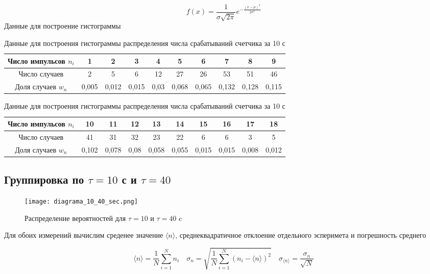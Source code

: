 \documentclass[a4paper]{article}
\begin{document}
\[
f(x) = \frac{1}{\sigma\sqrt{2\pi}} e^{-\frac{(x - \mu)^2}{2\sigma^2}}
\]
Данные для построение гистограммы 
\begin{table}[h]
\centering
\caption{Данные для построения гистограммы распределения числа срабатываний счетчика за 10 с}
\begin{tabular}{|c|c|c|c|c|c|c|c|c|c|}
\hline
Число импульсов $n_i$ & 1 & 2 & 3 & 4 & 5 & 6 & 7 & 8 & 9 \\ \hline
Число случаев & 2 & 5 & 6 & 12 & 27 & 26 & 53 & 51 & 46 \\ \hline
Доля случаев $w_n$ & 0,005 & 0,012 & 0,015 & 0,03 & 0,068 & 0,065 & 0,132 & 0,128 & 0,115 \\ \hline
\end{tabular}

\vspace{0.5cm}

\begin{tabular}{|c|c|c|c|c|c|c|c|c|c|}
\hline
Число импульсов $n_i$ & 10 & 11 & 12 & 13 & 14 & 15 & 16 & 17 & 18 \\ \hline
Число случаев & 41 & 31 & 32 & 23 & 22 & 6 & 6 & 3 & 5 \\ \hline
Доля случаев $w_n$ & 0,102 & 0,078 & 0,08 & 0,058 & 0,055 & 0,015 & 0,015 & 0,008 & 0,012 \\ \hline
\end{tabular}
\end{table}




\subsection{Группировка по \( \tau = 10 \) с и \( \tau = 40 \) }

\begin{figure}[h]
    \centering
    \texttt{[image: diagrama\_10\_40\_sec.png]}
    \caption{Распределение вероятностей для  $\tau = 10$ и $\tau = 40$ c}
    \label{fig:my_label}
\end{figure}


Для обоих измерений вычислим среденее значение $\langle n \rangle$, среднеквадратичное отклоение отдельного эсперимета и погрешность среднего

\begin{equation*}
\langle n \rangle = \frac{1}{N}\sum_{i=1}^{N} n_{i}
\quad
\sigma_n = \sqrt{\frac{1}{N}\sum_{i=1}^{N}(n_i - \langle n \rangle)^2}
\quad
\sigma_{\langle n \rangle} = \frac{\sigma_n}{\sqrt{N}}
\end{equation*}
\end{document}
